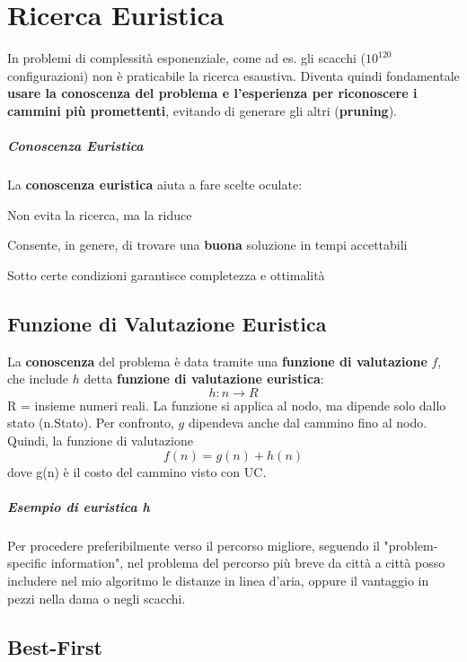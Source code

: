 \documentclass[10pt]{book}
\begin{document}
\chapter{Ricerca Euristica}
In problemi di complessità esponenziale, come ad es. gli scacchi ($10^{120}$ configurazioni) non è praticabile la ricerca esaustiva. Diventa quindi fondamentale \textbf{usare la conoscenza del problema e l'esperienza per riconoscere i cammini più promettenti}, evitando di generare gli altri (\textbf{pruning}).
\paragraph{Conoscenza Euristica} La \textbf{conoscenza euristica} aiuta a fare scelte oculate:
\begin{list}{}{}
	\item Non evita la ricerca, ma la riduce
	\item Consente, in genere, di trovare una \textbf{buona} soluzione in tempi accettabili
	\item Sotto certe condizioni garantisce completezza e ottimalità
\end{list}
\section{Funzione di Valutazione Euristica}
La \textbf{conoscenza} del problema è data tramite una \textbf{funzione di valutazione} $f$, che include $h$ detta \textbf{funzione di valutazione euristica}: $$h : n \rightarrow R$$
R = insieme numeri reali. La funzione si applica al nodo, ma dipende solo dallo stato (n.Stato). Per confronto, $g$ dipendeva anche dal cammino fino al nodo.
Quindi, la funzione di valutazione $$f(n) = g(n) + h(n)$$ dove g(n) è il costo del cammino visto con UC.
\paragraph{Esempio di euristica h} Per procedere preferibilmente verso il percorso migliore, seguendo il "problem-specific information", nel problema del percorso più breve da città a città posso includere nel mio algoritmo le distanze in linea d'aria, oppure il vantaggio in pezzi nella dama o negli scacchi.
\section{Best-First}
\end{document}
